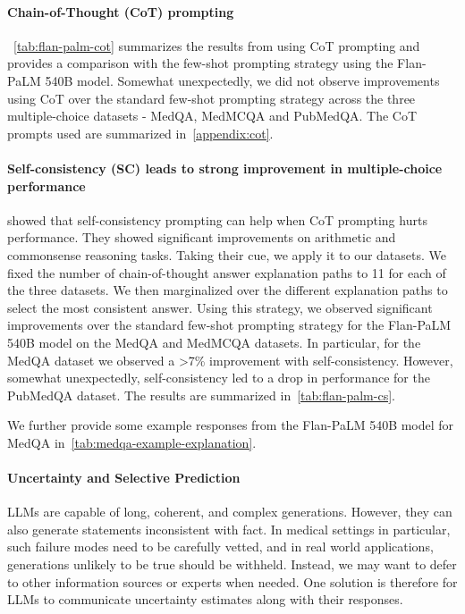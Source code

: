 \paragraph{Chain-of-Thought (CoT) prompting}
~\ref{tab:flan-palm-cot} summarizes the results from using CoT prompting and provides a comparison with the  few-shot prompting strategy using the Flan-PaLM 540B model. Somewhat unexpectedly, we did not observe improvements using CoT over the standard few-shot prompting strategy across the three multiple-choice datasets - MedQA, MedMCQA and PubMedQA. The CoT prompts used are summarized in~\ref{appendix:cot}.

\paragraph{Self-consistency (SC) leads to strong improvement in multiple-choice performance}

\citet{wang2022self} showed that self-consistency prompting can help when CoT prompting hurts performance. They showed significant improvements on arithmetic and commonsense reasoning tasks. Taking their cue, we apply it to our datasets. We fixed the number of chain-of-thought answer explanation paths to 11 for each of the three datasets. We then marginalized over the different explanation paths to select the most consistent answer. Using this strategy, we observed significant improvements over the standard few-shot prompting strategy for the Flan-PaLM 540B model on the MedQA and MedMCQA datasets. In particular, for the MedQA dataset we observed a >7\% improvement with self-consistency. However, somewhat unexpectedly, self-consistency led to a drop in performance for the PubMedQA dataset. The results are summarized in~\ref{tab:flan-palm-cs}.

We further provide some example responses from the Flan-PaLM 540B model for MedQA in~\ref{tab:medqa-example-explanation}. 

\paragraph{Uncertainty and Selective Prediction}

LLMs are capable of long, coherent, and complex generations. However, they can also generate statements inconsistent with fact. In medical settings in particular, such failure modes need to be carefully vetted, and in real world applications, generations unlikely to be true should be withheld. Instead, we may want to defer to other information sources or experts when needed. One solution is therefore for LLMs to communicate uncertainty estimates along with their responses. 

